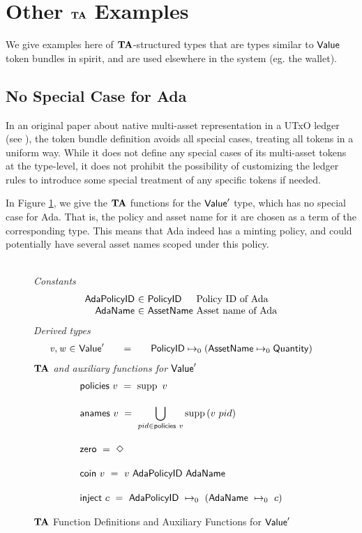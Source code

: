 \section{Other $\mathbf{TA}$ Examples}
\label{sec:other-valmonoids}

We give examples here of $\mathbf{TA}$-structured types
that are types similar to $\mathsf{Value}$ token bundles in spirit, and are used elsewhere
in the system (eg. the wallet).

\subsection{No Special Case for Ada}

In an original paper about native multi-asset representation in a UTxO ledger
(see \cite{utxo_ma}), the token bundle definition avoids all special cases, treating
all tokens in a uniform way.
While it does not define any special cases of its multi-asset tokens at the type-level,
it does not prohibit the possibility of customizing the ledger rules to introduce
some special treatment of any specific tokens if needed.

In Figure \ref{fig:no-special-ada}, we give the $\mathbf{TA}$ functions for
the $\mathsf{Value}'$ type, which has no special case for Ada. That is, the policy and
asset name for it are chosen as a term of the corresponding type. This means
that Ada indeed has a minting policy, and could potentially have several
asset names scoped under this policy. \\~\\

\begin{figure*}[t!]
  \emph{Constants}
  \begin{equation*}
    \begin{array}{r@{~\in~}l@{~}lr}
      \mathsf{AdaPolicyID} & \PolicyID & \text{Policy ID of Ada} \\
      \mathsf{AdaName} & \AssetName & \text{Asset name of Ada}
    \end{array}
  \end{equation*}
  \emph{Derived types}
  \begin{equation*}
    \begin{array}{r@{~\in~}l@{\qquad=\qquad}lr}
      \var{v}, \var{w} & \Value'
      & \PolicyID \mapsto_0 ( \AssetName \mapsto_0 \Quantity )
    \end{array}
  \end{equation*}
  \emph{$\mathbf{TA}$ and auxiliary functions for $\mathsf{Value}'$}
  \begin{align*}
    & \fun{policies}~v ~=~ \supp{~v}
    \nextdef
    & \fun{anames}~v ~=~ \bigcup_{pid \in\fun{policies}{~v}} \supp{(v~pid)}
    \nextdef
    & \fun{zero} ~=~ \Nothing
    \nextdef
    & \fun{coin}~v ~=~ v~\mathsf{AdaPolicyID}~\mathsf{AdaName}
    \nextdef
    & \fun{inject}~c  ~=~ \mathsf{AdaPolicyID}~\mapsto_0~(\mathsf{AdaName}~\mapsto_0~c)
  \end{align*}
  \caption{$\mathbf{TA}$ Function Definitions and Auxiliary Functions for $\mathsf{Value}'$}
  \label{fig:no-special-ada}
\end{figure*}


